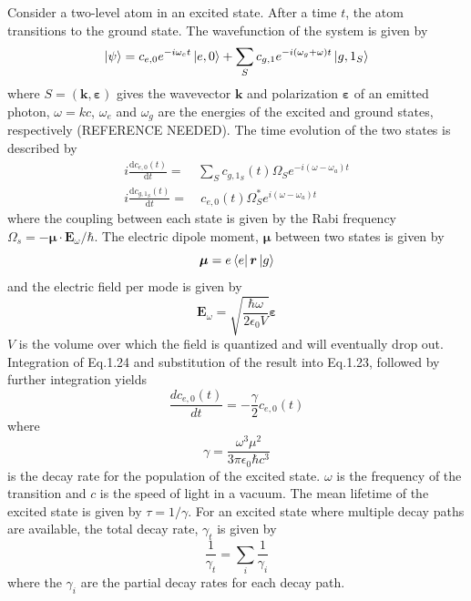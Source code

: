 Consider a two-level atom in an excited state. After a time $t$, the atom transitions to the ground state. The wavefunction of the system is given by
\begin{equation}
\ket{\psi} = c_{e,0}e^{-i\omega_et}\ket{e,0} + \sum_Sc_{g,1}e^{-i(\omega_g+\omega)t}\ket{g,1_S}
\end{equation}
where $S = (\bm{k},\bm{\varepsilon})$ gives the wavevector $\bm{k}$ and polarization $\bm{\varepsilon}$ of an emitted photon, $\omega = kc$, $\omega_e$ and $\omega_g$ are the energies of the excited and ground states, respectively (REFERENCE NEEDED). The time evolution of the two states is described by
\begin{align}
i\frac{\mathrm{d}c_{e,0}(t)}{\mathrm{d}t} =& \sum_Sc_{g,1_S}(t)\Omega_S e^{-i(\omega-\omega_a)t}\\
i\frac{\mathrm{d}c_{g,1_S}(t)}{\mathrm{d}t} =& \ c_{e,0}(t)\Omega_S^*e^{i(\omega-\omega_a)t}
\end{align}
where the coupling between each state is given by the Rabi frequency \\$\Omega_s = -\bm{\mu}\cdot\bm{E}_{\omega}/\hbar$. The electric dipole moment, $\bm{\mu}$ between two states is given by
\begin{equation}
\bm{\mu} = e\bra{e}\bm{r}\ket{g} 
\end{equation}
and the electric field per mode is given by
\begin{equation}
\bm{E}_{\omega} = \sqrt{\frac{\hbar\omega}{2\epsilon_0V}}\bm{\varepsilon}
\end{equation}
$V$ is the volume over which the field is quantized and will eventually drop out. Integration of Eq.1.24 and substitution of the result into Eq.1.23, followed by further integration yields 
\begin{equation}
\frac{d c_{e,0}(t)}{dt} = -\frac{\gamma}{2}c_{e,0}(t)
\end{equation}
where
\begin{equation}
\gamma = \frac{\omega^3\mu^2}{3\pi\epsilon_0\hbar c^3}
\label{gamma}
\end{equation}
is the decay rate for the population of the excited state. $\omega$ is the frequency of the transition and $c$ is the speed of light in a vacuum. The mean lifetime of the excited state is given by $\tau = 1/\gamma$. For an excited state where multiple decay paths are available, the total decay rate, $\gamma_t$ is given by
\begin{equation}
\frac{1}{\gamma_t} = \sum_i \frac{1}{\gamma_i}
\label{totdec}
\end{equation}
where the $\gamma_i$ are the partial decay rates for each decay path.


